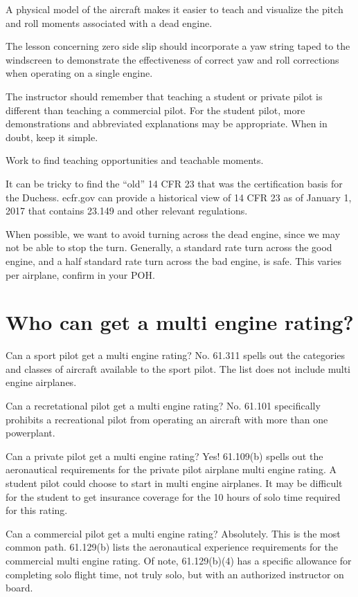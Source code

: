 {A physical model of the aircraft makes it easier to teach and visualize the pitch and roll moments
associated with a dead engine.

The lesson concerning zero side slip should incorporate a yaw string taped to the windscreen to demonstrate
the effectiveness of correct yaw and roll corrections when operating on a single engine.

The instructor should remember that teaching a student or private pilot is different than teaching
a commercial pilot. For the student pilot, more demonstrations and abbreviated explanations may be
appropriate. When in doubt, keep it simple.

Work to find teaching opportunities and teachable moments.

It can be tricky to find the ``old'' 14 CFR 23 that was the certification basis for the Duchess. ecfr.gov can provide
a historical view of 14 CFR 23 as of January 1, 2017 that contains 23.149 and other relevant regulations.

When possible, we want to avoid turning across the dead engine, since we may not be able to
stop the turn. Generally, a standard rate turn across the good engine, and a half standard rate turn across
the bad engine, is safe. This varies per airplane, confirm in your POH.

\section{Who can get a multi engine rating?}

Can a sport pilot get a multi engine rating? No. 61.311 spells out the categories and classes
of aircraft available to the sport pilot. The list does not include multi engine airplanes.

Can a recretational pilot get a multi engine rating? No. 61.101 specifically prohibits
a recreational pilot from operating an aircraft with more than one powerplant.

Can a private pilot get a multi engine rating? Yes! 61.109(b) spells out the aeronautical requirements
for the private pilot airplane multi engine rating. A student pilot could choose to start in multi
engine airplanes. It may be difficult for the student to get insurance coverage for the 10 hours
of solo time required for this rating.

Can a commercial pilot get a multi engine rating? Absolutely. This is the most common path.
61.129(b) lists the aeronautical experience requirements for the commercial multi engine rating.
Of note, 61.129(b)(4) has a specific allowance for completing solo flight time, not truly solo, but
with an authorized instructor on board.

}
